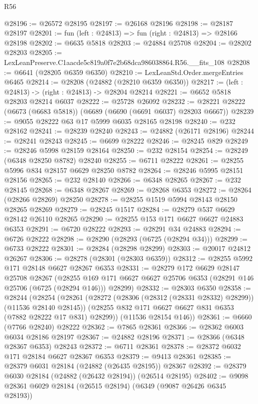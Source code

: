 \begin{lexlean}{R56}
\begin{coremodule}
@28196 := @26572 @28195
@28197 := @26168 @28196
@28198 := @28187 @28197
@28201 := fun (left : @24813) => fun (right : @24813) => @28166 @28198
@28202 := @6635 @5818
@28203 := @24884 @25708
@28204 := @28202 @28203
@28205 := LexLeanPreserve.C1aacde5c819a0f7e2b68dca986038864.R56.__fits_108
@28208 := @6641 (@28205 @6359 @6350)
@28210 := LexLeanStd.Order.mergeEntries @6465
@28214 := @28208 (@24882 (@28210 @6359 @6350))
@28217 := (left : @24813) -> (right : @24813) -> @28204 @28214
@28221 := @6652 @5818 @28203 @28214 @6037
@28222 := @25728 @26092
@28232 := @28221 @28222 (@6673 (@6683 @5818)) (@6689 (@6690 (@6691 @6037) @28203 @6667))
@28239 := @9055 @28222 @63 @17 @5999 @6035 @28165 @28198
@28240 := @232 @28162
@28241 := @28239 @28240
@28243 := @24882 (@26171 @28196)
@28244 := @28241 @28243
@28245 := @6699 @28222
@28246 := @28245 @829
@28249 := @28246 @5998 @28159 @28164
@28250 := @232 @28154
@28254 := @28249 (@6348 @28250 @8782) @28240
@28255 := @6711 @28222
@28261 := @28255 @5996 @834 @28157 @6629 @28250 @8782
@28264 := @28246 @5995 @28151 @28156
@28265 := @232 @28140
@28266 := @6348 @28265
@28267 := @232 @28145
@28268 := @6348 @28267
@28269 := @28268 @6353
@28272 := @28264 (@28266 @28269) @28250
@28278 := @28255 @1519 @5994 @28143 @28150 @28265 @28269
@28279 := @28245 @1517
@28284 := @28279 @537 @6629 @28142 @26110 @28265
@28290 := @28255 @153 @171 @6627 @6627 @24883 @6353
@28291 := @6720 @28222
@28293 := @28291 @34 @24883
@28294 := @6726 @28222
@28298 := @28290 (@28293 (@6725 (@28294 @34)))
@28299 := @6733 @28222
@28301 := @28284 (@28298 @28299)
@28303 := @20017 @24812 @26267
@28306 := @28278 (@28301 (@28303 @6359))
@28312 := @28255 @5992 @171 @28148 @6627 @28267 @6353
@28331 := @28279
    @172
    @6629
    @28147
    @25708
    @28267
    (@28255 @169 @171 @6627 @6627 @25706 @6353 (@28291 @146 @25706 (@6725 (@28294 @146))) @28299)
@28332 := @28303 @6350
@28358 := @28244
    (@28254
      (@28261
        (@28272 (@28306 (@28312 (@28331 @28332) @28299)) (@11536 @28140 @28145))
        (@28255 @832 @171 @6627 @6627 @831 @6353 (@7882 @28222 @17 @831) @28299))
      (@11536 @28154 @146))
@28361 := @6660 (@7766 @28240) @28222
@28362 := @7865 @28361
@28366 := @28362 @6003 @6034 @28186 @28197
@28367 := @24882 @28196
@28371 := @28366 (@6348 @28367 @6353) @28243
@28372 := @6711 @28361
@28378 := @28372 @6032 @171 @28184 @6627 @28367 @6353
@28379 := @9413 @28361
@28385 := @28379 @6031 @28184 (@24882 (@26435 @28195)) @28367
@28392 := @28379 @6030 @28184 (@24882 (@26432 @28194)) (@26514 @28195)
@28402 := @9098 @28361 @6029 @28184 (@26515 @28194) (@6349 (@9087 @26426 @6345 @28193))

\end{coremodule}
\end{lexlean}
